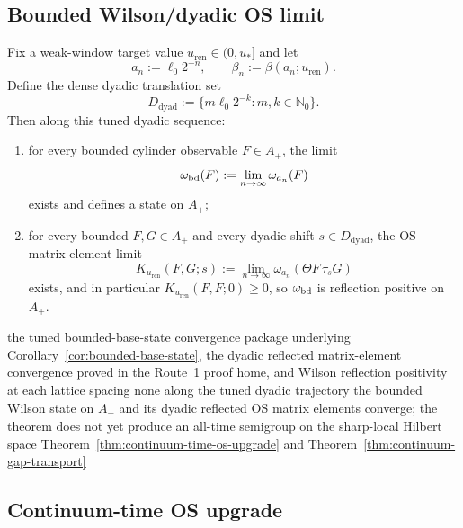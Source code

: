 \subsection{Bounded Wilson/dyadic OS limit}

\begin{theorem}\label{thm:bounded-wilson-os-limit}
Fix a weak-window target value $u_{\mathrm{ren}}\in(0,u_*]$ and let
\[
a_n:=\ell_0 2^{-n},\qquad \beta_n:=\beta(a_n;u_{\mathrm{ren}}).
\]
Define the dense dyadic translation set
\[
D_{\mathrm{dyad}}:=\{m\ell_0 2^{-k}:m,k\in\mathbb N_0\}.
\]
Then along this tuned dyadic sequence:
\begin{enumerate}[label=\textup{(\roman*)},leftmargin=2.25em]
\item for every bounded cylinder observable $F\in A_+$, the limit
\[
\omega_{\mathrm{bd}}(F):=\lim_{n\to\infty}\omega_{a_n}(F)
\]
exists and defines a state on $A_+$;
\item for every bounded $F,G\in A_+$ and every dyadic shift $s\in D_{\mathrm{dyad}}$, the OS matrix-element limit
\[
K_{u_{\mathrm{ren}}}(F,G;s):=\lim_{n\to\infty}\omega_{a_n}(\Theta F\,\tau_s G)
\]
exists, and in particular $K_{u_{\mathrm{ren}}}(F,F;0)\ge 0$, so $\omega_{\mathrm{bd}}$ is reflection positive on $A_+$.
\end{enumerate}
\end{theorem}

\dependencyledger
  {the tuned bounded-base-state convergence package underlying Corollary~\ref{cor:bounded-base-state}, the dyadic reflected matrix-element convergence proved in the Route~1 proof home, and Wilson reflection positivity at each lattice spacing}
  {none}
  {along the tuned dyadic trajectory the bounded Wilson state on $A_+$ and its dyadic reflected OS matrix elements converge; the theorem does not yet produce an all-time semigroup on the sharp-local Hilbert space}
  {Theorem~\ref{thm:continuum-time-os-upgrade} and Theorem~\ref{thm:continuum-gap-transport}}

\subsection{Continuum-time OS upgrade}

